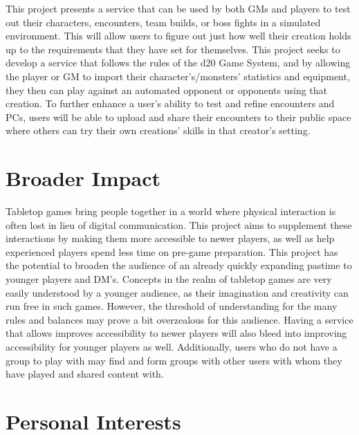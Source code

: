 \documentclass[12pt,a4paper]{report}
\begin{document}
This project presents a service that can be used by both GMs and players to test out their characters, encounters, team builds, or boss fights in a simulated environment. This will allow users to figure out just how well their creation holds up to the requirements that they have set for themselves. This project seeks to develop a service that follows the rules of the d20 Game System, and by allowing the player or GM to import their character's/monsters' statistics and equipment, they then can play against an automated opponent or opponents using that creation. To further enhance a user's ability to test and refine encounters and PCs, users will be able to upload and share their encounters to their public space where others can try their own creations' skills in that creator's setting.

\newpage
\chapter*{Broader Impact}

Tabletop games bring people together in a world where physical interaction is often lost in lieu of digital communication. This project aims to supplement these interactions by making them more accessible to newer players, as well as help experienced players spend less time on pre-game preparation. This project has the potential to broaden the audience of an already quickly expanding pastime to younger players and DM's. Concepts in the realm of tabletop games are very easily understood by a younger audience, as their imagination and creativity can run free in such games. However, the threshold of understanding for the many rules and balances may prove a bit overzealous for this audience. Having a service that allows improves accessibility to newer players will also bleed into improving accessibility for younger players as well. Additionally, users who do not have a group to play with may find and form groups with other users with whom they have played and shared content with.
	
\newpage
\chapter*{Personal Interests}
\end{document}
